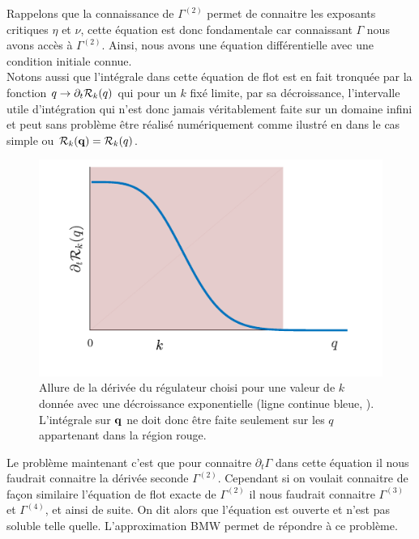 \documentclass[10pt]{article}
\begin{document}
\begin{multicols}{2}
Rappelons que la connaissance de $\Gamma^{(2)}$ permet de connaitre les exposants critiques $\eta$ et $\nu$, cette équation est donc fondamentale car connaissant $\Gamma$ nous avons accès à $\Gamma^{(2)}$. Ainsi, nous avons une équation différentielle avec une condition initiale connue.\\

Notons aussi que l'intégrale dans cette équation de flot est en fait tronquée par la fonction $q \to \partial_t\mathcal{R}_k(q)$ qui pour un $k$ fixé limite, par sa décroissance, l'intervalle utile d'intégration qui n'est donc jamais véritablement faite sur un domaine infini et peut sans problème être réalisé numériquement comme ilustré en  dans le cas simple ou $\mathcal{R}_k({\bf q}) = \mathcal{R}_k(q)$.\\

\begin{figure}[H]
\begin{center}
	\includegraphics[width=0.95\columnwidth]{derReg.pdf}
\end{center}
\vspace*{-22pt}
\caption{Allure de la dérivée du régulateur choisi pour une valeur de $k$ donnée avec une décroissance exponentielle (ligne continue bleue, ). L'intégrale sur ${\bf q}$ ne doit donc être faite seulement sur les $q$ appartenant dans la région rouge.}
\label{fig:derReg}
\end{figure}



Le problème maintenant c'est que pour connaitre $\partial_t \Gamma$ dans cette équation il nous faudrait connaitre la dérivée seconde $\Gamma^{(2)}$. Cependant si on voulait connaitre de façon similaire l'équation de flot exacte de $\Gamma^{(2)}$ il nous faudrait connaitre $\Gamma^{(3)}$ et $\Gamma^{(4)}$, et ainsi de suite. On dit alors que l'équation est ouverte et n'est pas soluble telle quelle. L'approximation BMW permet de répondre à ce problème. \\



\end{multicols}
\end{document}
